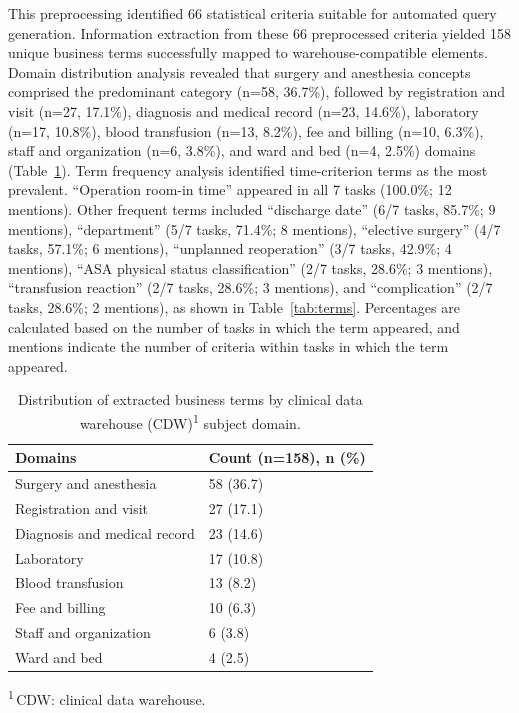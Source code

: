 \documentclass[10pt]{article}
\newcommand{\tnote}[1]{\textsuperscript{#1}}
\newcommand{\tabfoot}[1]{\par\vspace{2pt}\begingroup\raggedright\footnotesize
  \noindent #1\par\endgroup}
\newcommand{\tnotedef}[1]{\textsuperscript{#1}\,}
\begin{document}
This preprocessing identified 66 statistical criteria suitable for automated
query generation. Information extraction from these 66 preprocessed criteria
yielded 158 unique business terms successfully mapped to warehouse-compatible
elements. Domain distribution analysis revealed that surgery and anesthesia
concepts comprised the predominant category (n=58, 36.7\%), followed by registration and visit (n=27, 17.1\%), diagnosis and medical record (n=23, 14.6\%), laboratory (n=17, 10.8\%), blood transfusion (n=13, 8.2\%), fee and billing (n=10, 6.3\%), staff and organization (n=6, 3.8\%), and ward and bed (n=4, 2.5\%) domains (Table~\ref{tab:domains}). Term frequency analysis
identified time-criterion terms as the most prevalent. ``Operation room-in
time'' appeared in all 7 tasks (100.0\%; 12 mentions). Other frequent terms
included ``discharge date'' (6/7 tasks, 85.7\%; 9 mentions), ``department'' (5/7 tasks, 71.4\%; 8 mentions), ``elective surgery'' (4/7 tasks, 57.1\%; 6 mentions), ``unplanned reoperation'' (3/7 tasks, 42.9\%; 4 mentions), ``ASA
physical status classification'' (2/7 tasks, 28.6\%; 3 mentions), ``transfusion
reaction'' (2/7 tasks, 28.6\%; 3 mentions), and ``complication'' (2/7 tasks, 28.6\%; 2 mentions), as shown in Table~\ref{tab:terms}. Percentages are
calculated based on the number of tasks in which the term appeared, and mentions
indicate the number of criteria within tasks in which the term appeared.

\begin{table}[!ht]
\caption{Distribution of extracted business terms by clinical data warehouse
(CDW)\tnote{1} subject domain.}
\label{tab:domains}
\centering
\footnotesize
\begin{tabular*}{\linewidth}{@{\extracolsep{\fill}}ll@{}}
\toprule
Domains & Count (n=158), n (\%)\\
\midrule
Surgery and anesthesia        & 58 (36.7)\\
Registration and visit        & 27 (17.1)\\
Diagnosis and medical record  & 23 (14.6)\\
Laboratory                    & 17 (10.8)\\
Blood transfusion             & 13 (8.2)\\
Fee and billing               & 10 (6.3)\\
Staff and organization        & 6 (3.8)\\
Ward and bed                  & 4 (2.5)\\
\bottomrule
\end{tabular*}
\tabfoot{\tnotedef{1}CDW: clinical data warehouse.}
\end{table}
\end{document}
